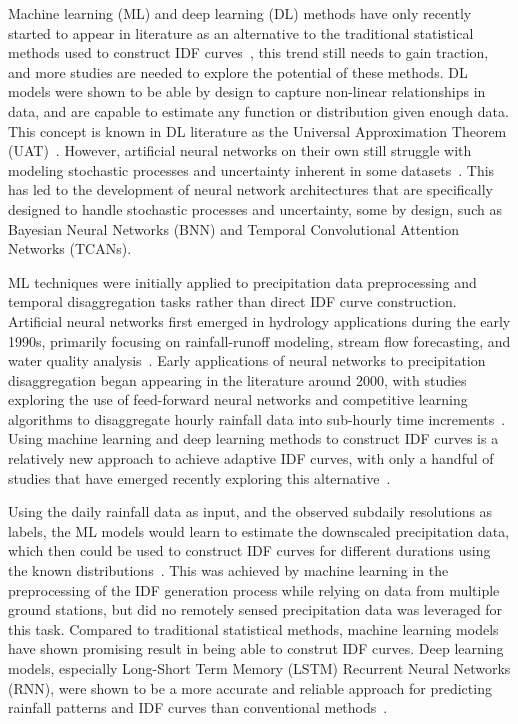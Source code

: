 Machine learning (ML) and deep learning (DL) methods have only recently started to appear in literature as an alternative to the traditional statistical methods used to construct IDF curves~\cite{13}, this trend still needs to gain traction, and more studies are needed to explore the potential of these methods. DL models were shown to be able by design to capture non-linear relationships in data, and are capable to estimate any function or distribution given enough data. This concept is known in DL literature as the Universal Approximation Theorem (UAT)~\cite{15}. However, artificial neural networks on their own still struggle with modeling stochastic processes and uncertainty inherent in some datasets~\cite{16}. This has led to the development of neural network architectures that are specifically designed to handle stochastic processes and uncertainty, some by design, such as Bayesian Neural Networks (BNN) and Temporal Convolutional Attention Networks (TCANs).~\cite{17, 18}

\vspace{1em}

ML techniques were initially applied to precipitation data preprocessing and temporal disaggregation tasks rather than direct IDF curve construction. Artificial neural networks first emerged in hydrology applications during the early 1990s, primarily focusing on rainfall-runoff modeling, stream flow forecasting, and water quality analysis~\cite{19}. Early applications of neural networks to precipitation disaggregation began appearing in the literature around 2000, with studies exploring the use of feed-forward neural networks and competitive learning algorithms to disaggregate hourly rainfall data into sub-hourly time increments~\cite{19}. Using machine learning and deep learning methods to construct IDF curves is a relatively new approach to achieve adaptive IDF curves, with only a handful of studies that have emerged recently exploring this alternative~\cite{13, 14}.

\vspace{1em}

Using the daily rainfall data as input, and the observed subdaily resolutions as labels, the ML models would learn to estimate the downscaled precipitation data, which then could be used to construct IDF curves for different durations using the known distributions~\cite{20}. This was achieved by machine learning in the preprocessing of the IDF generation process while relying on data from multiple ground stations, but did no remotely sensed precipitation data was leveraged for this task. Compared to traditional statistical methods, machine learning models have shown promising result in being able to construt IDF curves. Deep learning models, especially Long-Short Term Memory (LSTM) Recurrent Neural Networks (RNN), were shown to be a more accurate and reliable approach for predicting rainfall patterns and IDF curves than conventional methods~\cite{14}.